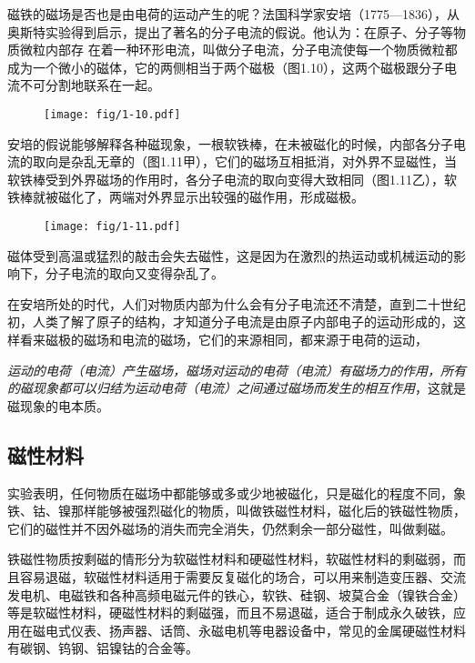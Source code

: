 磁铁的磁场是否也是由电荷的运动产生的呢？法国科学家安培（1775—1836），从奥斯特实验得到启示，提出了著名的分子电流的假说。他认为：在原子、分子等物质微粒内部存
在着一种环形电流，叫做分子电流，分子电流使每一个物质微粒都成为一个微小的磁体，它的两侧相当于两个磁极（图1.10），这两个磁极跟分子电流不可分割地联系在一起。

\begin{figure}[htp]\centering
\texttt{[image: fig/1-10.pdf]}
\caption{}
\end{figure}

安培的假说能够解释各种磁现象，一根软铁棒，在未被磁化的时候，内部各分子电流的取向是杂乱无章的（图1.11甲），它们的磁场互相抵消，对外界不显磁性，当软铁棒受到外界磁场的作用时，各分子电流的取向变得大致相同（图1.11乙），软铁棒就被磁化了，两端对外界显示出较强的磁作用，形成磁极。

\begin{figure}[htp]\centering
\texttt{[image: fig/1-11.pdf]}
\caption{}
\end{figure}

磁体受到高温或猛烈的敲击会失去磁性，这是因为在激烈的热运动或机械运动的影响下，分子电流的取向又变得杂乱了。

在安培所处的时代，人们对物质内部为什么会有分子电流还不清楚，直到二十世纪初，人类了解了原子的结构，才知道分子电流是由原子内部电子的运动形成的，这样看来磁极的磁场和电流的磁场，它们的来源相同，都来源于电荷的运动，

\textit{运动的电荷（电流）产生磁场，磁场对运动的电荷（电流）有磁场力的作用，所有的磁现象都可以归结为运动电荷（电流）之间通过磁场而发生的相互作用}，这就是磁现象的电本质。

\subsection{磁性材料}

实验表明，任何物质在磁场中都能够或多或少地被磁化，只是磁化的程度不同，象铁、钴、镍那样能够被强烈磁化的物质，叫做铁磁性材料，磁化后的铁磁性物质，它们的磁性并不因外磁场的消失而完全消失，仍然剩余一部分磁性，叫做剩磁。

铁磁性物质按剩磁的情形分为软磁性材料和硬磁性材料，软磁性材料的剩磁弱，而且容易退磁，软磁性材料适用于需要反复磁化的场合，可以用来制造变压器、交流发电机、电磁铁和各种高频电磁元件的铁心，软铁、硅钢、坡莫合金（镍铁合金）等是软磁性材料，硬磁性材料的剩磁强，而且不易退磁，适合于制成永久破铁，应用在磁电式仪表、扬声器、话筒、永磁电机等电器设备中，常见的金属硬磁性材料有碳钢、钨钢、铝镍钴的合金等。

